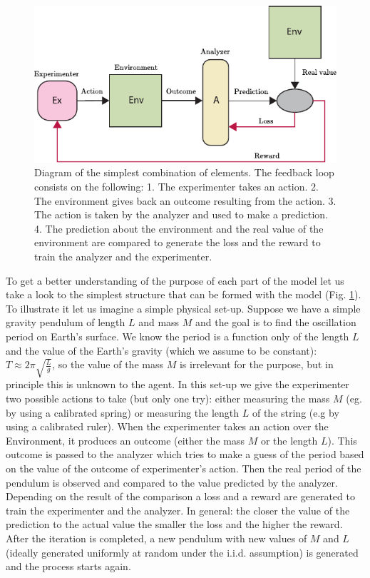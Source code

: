 \documentclass[11pt,a4paper,twoside]{report}
\newcommand{\+}{\textnormal{+} }
\theoremstyle{definition}
\numberwithin{equation}{chapter}
\begin{document}
\begin{figure}
  \centering
  \includegraphics{figures/SimpleSetUp.pdf}
  \caption{Diagram of the simplest combination of elements. The feedback loop
  consists on the following: 1. The experimenter takes an action. 2. The
  environment gives back an outcome resulting from the action. 3. The action is
  taken by the analyzer and used to make a prediction. 4. The prediction about
  the environment and the real value of the environment are compared to generate
  the loss and the reward to train the analyzer and the experimenter.}
  \label{fig:simplesetup}
\end{figure}

To get a better understanding of the purpose of each part of the model let us
take a look to the simplest structure that can be formed with the model (Fig.
\ref{fig:simplesetup}). To illustrate it let us imagine a simple physical set-up.
Suppose we have a simple gravity pendulum of length $L$ and mass $M$ and the
goal is to find the oscillation period on Earth's surface. We know the period is
a function only of the length $L$ and the value of the Earth's gravity (which we
assume to be constant): $T \approx 2\pi\sqrt{\frac{L}{g}}$, so the value of the
mass $M$ is irrelevant for the purpose, but in principle this is unknown to the
agent. In this set-up we give the experimenter two possible actions to take (but
only one try): either measuring the mass $M$ (eg. by using a calibrated spring)
or measuring the length $L$ of the string (e.g by using a calibrated ruler).
When the experimenter takes an action over the Environment, it produces an
outcome (either the mass $M$ or the length $L$). This outcome is passed to the
analyzer which tries to make a guess of the period based on the value of the
outcome of experimenter's action. Then the real period of the pendulum is
observed and compared to the value predicted by the analyzer. Depending on the
result of the comparison a loss and a reward are generated to train the
experimenter and the analyzer. In general: the closer the value of the
prediction to the actual value the smaller the loss and the higher the reward.
After the iteration is completed, a new pendulum with new values of $M$ and $L$
(ideally generated uniformly at random under the i.i.d. assumption) is generated
and the process starts again.
\end{document}
